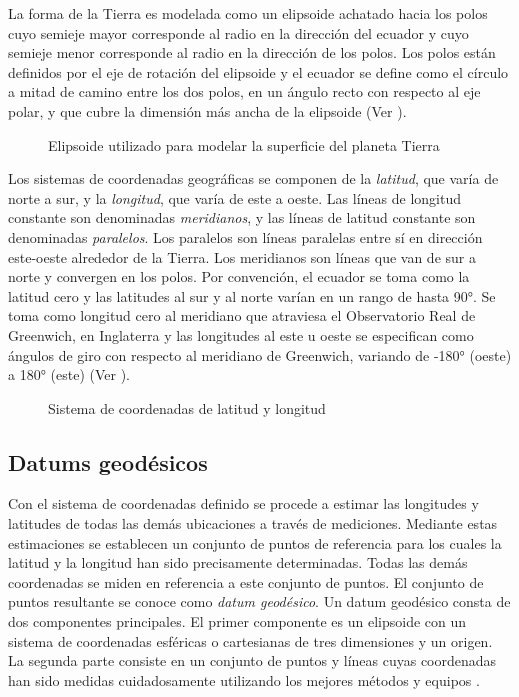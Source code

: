 La forma de la Tierra es modelada como un elipsoide achatado hacia los polos cuyo semieje mayor corresponde al radio en la dirección del ecuador y cuyo semieje menor corresponde al radio en la dirección de los polos. Los polos están definidos por el eje de rotación del elipsoide y el ecuador se define como el círculo a mitad de camino entre los dos polos, en un ángulo recto con respecto al eje polar, y que cubre la dimensión más ancha de la elipsoide (Ver ).

\begin{figure}[h]
	\centering
	
	\caption[Elipsoide que modela la superficie de la Tierra]{Elipsoide utilizado para modelar la superficie del planeta Tierra}
	\label{fig:elipsoide} 
\end{figure}

Los sistemas de coordenadas geográficas se componen de la \emph{latitud}, que varía de norte a sur, y la \emph{longitud}, que varía de este a oeste. Las líneas de longitud constante son denominadas \emph{meridianos}, y las líneas de latitud constante son denominadas \emph{paralelos}. Los paralelos son líneas paralelas entre sí en dirección este-oeste alrededor de la Tierra. Los meridianos son líneas que van de sur a norte y convergen en los polos. Por convención, el ecuador se toma como la latitud cero y las latitudes al sur y al norte varían en un rango de hasta 90°. Se toma como longitud cero al meridiano que atraviesa el Observatorio Real de Greenwich, en Inglaterra y las longitudes al este u oeste se especifican como ángulos de giro con respecto al meridiano de Greenwich, variando de -180° (oeste) a 180° (este) (Ver ).

\begin{figure}[h]
	\centering
	
	\caption[Sistema de coordenadas de latitud y longitud]{Sistema de coordenadas de latitud y longitud}
	\label{fig:coordenadas} 
\end{figure}

\subsection{Datums geodésicos}

Con el sistema de coordenadas definido se procede a estimar las longitudes y latitudes de todas las demás ubicaciones a través de mediciones. Mediante estas estimaciones se establecen un conjunto de puntos de referencia para los cuales la latitud y la longitud han sido precisamente determinadas. Todas las demás coordenadas se miden en referencia a este conjunto de puntos. El conjunto de puntos resultante se conoce como \emph{datum geodésico}.  Un datum geodésico consta de dos componentes principales. El primer componente es un elipsoide con un sistema de coordenadas esféricas o cartesianas de tres dimensiones y un origen. La segunda parte consiste en un conjunto de puntos y líneas cuyas coordenadas han sido medidas cuidadosamente utilizando los mejores métodos y equipos \cite{bolstad2005gis}.


